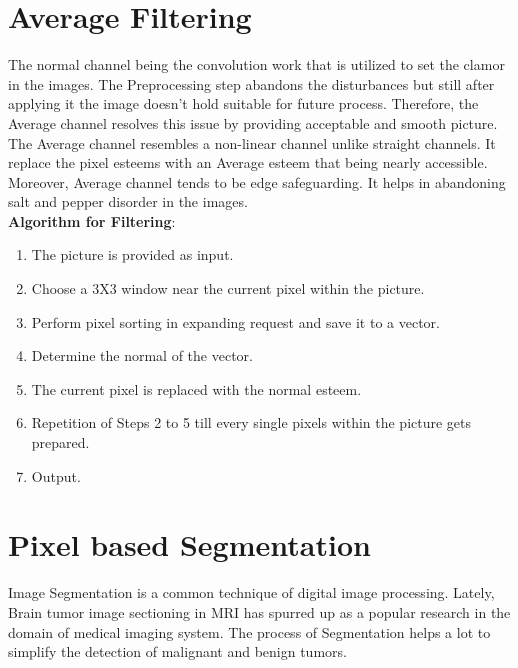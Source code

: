 \documentclass[a4paper, 12pt]{report}
\begin{document}
\begin{spacing}{1.5}
\section{Average Filtering}
\par The normal channel being the convolution work that is utilized to set the clamor in the images. The Preprocessing step abandons the disturbances but still after applying it the image doesn’t hold suitable for future process. Therefore, the Average channel resolves this issue by providing acceptable and smooth picture. The Average channel resembles a non-linear channel unlike straight channels. It replace the pixel esteems with an Average esteem that being nearly accessible. Moreover, Average channel tends to be edge safeguarding. It helps in abandoning salt and pepper disorder in the images.\\

\textbf{Algorithm for Filtering}:
\begin{enumerate}
	\item The picture is provided as input.
	\item Choose a 3X3 window near the current pixel within the picture.
	\item Perform pixel sorting in expanding request and save it to a vector.
	\item Determine the normal of the vector.
	\item The current pixel is replaced with the normal esteem.
	\item Repetition of Steps 2 to 5 till every single pixels within the picture gets prepared.
	\item Output.
\end{enumerate}

\section{Pixel based Segmentation}
\par Image Segmentation is a common technique of digital image processing. Lately, Brain tumor image sectioning in MRI has spurred up as a popular research in the domain of medical imaging system. The process of Segmentation helps a lot to simplify the detection of malignant and benign tumors.


\end{spacing}
\end{document}
